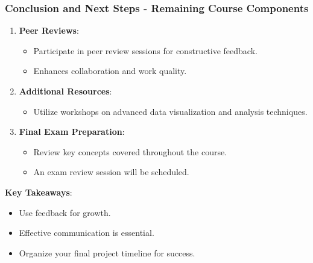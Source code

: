 \documentclass[aspectratio=169]{beamer}
\begin{document}
\begin{frame}[fragile]
    \frametitle{Conclusion and Next Steps - Remaining Course Components}
    \begin{enumerate}
        \item \textbf{Peer Reviews}:
        \begin{itemize}
            \item Participate in peer review sessions for constructive feedback.
            \item Enhances collaboration and work quality.
        \end{itemize}

        \item \textbf{Additional Resources}:
        \begin{itemize}
            \item Utilize workshops on advanced data visualization and analysis techniques.
        \end{itemize}

        \item \textbf{Final Exam Preparation}:
        \begin{itemize}
            \item Review key concepts covered throughout the course.
            \item An exam review session will be scheduled.
        \end{itemize}
    \end{enumerate}

    \textbf{Key Takeaways}:
    \begin{itemize}
        \item Use feedback for growth.
        \item Effective communication is essential.
        \item Organize your final project timeline for success.
    \end{itemize}
\end{frame}
\end{document}
